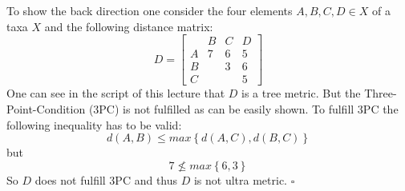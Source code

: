\documentclass[%
   10pt,              %
   ngerman,           %
   a4paper,           %
   DIV11,             %
]{scrartcl}%
\begin{document}
To show the back direction one consider the four elements $A, B, C, D \in X$ of a taxa $X$ and the 
following distance matrix:
\begin{equation}
 D = \begin{bmatrix}
        & B & C & D \\
      A & 7 & 6 & 5 \\
      B &   & 3 & 6 \\
      C &   &   & 5
     \end{bmatrix} \nonumber
\end{equation}
One can see in the script of this lecture that $D$ is a tree metric. But the Three-Point-Condition 
(3PC) is not fulfilled as can be easily shown. To fulfill 3PC the following inequality has to be 
valid:
\begin{equation}
 d(A,B) \le max \left\lbrace d(A,C), d(B,C) \right\rbrace \nonumber
\end{equation}
but
\begin{equation}
 7 \nleq max \left\lbrace 6, 3  \right\rbrace \nonumber
\end{equation}
So $D$ does not fulfill 3PC and thus $D$ is not ultra metric. $\square$

\subsection{}

\begin{thebibliography}{20}
	
\end{thebibliography}
\end{document}

